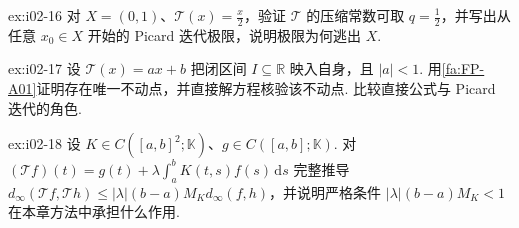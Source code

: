 \begin{FAExercise}[压缩映射的完备性边界]{ex:i02-16}
对 \(\displaystyle X=(0,1)\)、\(\displaystyle \mathcal T(x)=\frac{x}{2}\)，验证 \(\displaystyle \mathcal T\) 的压缩常数可取 \(\displaystyle q=\frac{1}{2}\)，并写出从任意 \(\displaystyle x_0\in X\) 开始的 Picard 迭代极限，说明极限为何逃出 \(\displaystyle X\).
\end{FAExercise}

\begin{FAExercise}[仿射压缩迭代]{ex:i02-17}
设 \(\displaystyle \mathcal T(x)=ax+b\) 把闭区间 \(\displaystyle I\subseteq\mathbb R\) 映入自身，且 \(\displaystyle |a|<1\). 用\autoref{fa:FP-A01}证明存在唯一不动点，并直接解方程核验该不动点. 比较直接公式与 Picard 迭代的角色.
\end{FAExercise}

\begin{FAExercise}[积分方程的压缩条件]{ex:i02-18}
设 \(\displaystyle K\in C([a,b]^2;\mathbb K)\)、\(\displaystyle g\in C([a,b];\mathbb K)\). 对 \(\displaystyle (\mathcal T f)(t)=g(t)+\lambda\int_a^b K(t,s)f(s)\,\mathrm{d}s\)
完整推导 \(\displaystyle d_\infty(\mathcal T f,\mathcal T h)\leqslant |\lambda|(b-a)M_Kd_\infty(f,h)\)，并说明严格条件 \(\displaystyle |\lambda|(b-a)M_K<1\) 在本章方法中承担什么作用.
\end{FAExercise}

